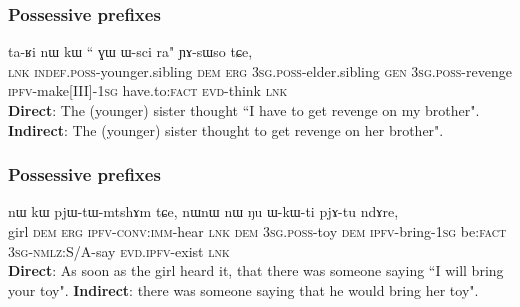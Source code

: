 \documentclass[xcolor=table]{beamer}
\newcommand{\rouge}[1]{{\color{red}#1}}
\newcommand{\bleu}[1]{{\color{blue}#1}}
\newcommand{\ipa}[1]{{\phon #1}} %
\begin{document}
 
 
   \begin{frame} 
   \frametitle{Possessive prefixes}
\begin{exe}
\ex
\gll  \ipa{tɕe}  	\ipa{ta-ʁi}  	\ipa{nɯ}  	\ipa{kɯ}  	``\rouge{\ipa{ɯ-pi}}  	\ipa{ɣɯ}  	\ipa{ɯ-sci}  	\bleu{\ipa{tu-nɤme-a}}  	\ipa{ra}" 	\ipa{ɲɤ-sɯso}  	\ipa{tɕe,}  	\\
\textsc{lnk}  \textsc{indef.poss}-younger.sibling \textsc{dem} \textsc{erg}  \rouge{\textsc{3sg.poss}-elder.sibling}  \textsc{gen} \textsc{3sg.poss}-revenge \bleu{\textsc{ipfv}-make[III]-\textsc{1sg}} have.to:\textsc{fact} \textsc{evd}-think \textsc{lnk} \\
\glt  \textbf{Direct}: The (younger) sister thought ``\bleu{I have to get revenge} on \rouge{my brother}".
\glt  \textbf{Indirect}:  The (younger) sister thought  to get revenge on \rouge{her brother}".
  \end{exe}
 \end{frame} 
 

    \begin{frame} 
       \frametitle{Possessive prefixes}
\begin{exe}
\ex
\gll   \ipa{tɤɕime}  	\ipa{nɯ}  	\ipa{kɯ}  	\ipa{pjɯ-tɯ-mtshɤm}  	\ipa{tɕe,}  	\ipa{nɯnɯ}  \rouge{\ipa{ɯ-kɯmtɕhɯ}}  	\ipa{nɯ}  	\bleu{\ipa{ju-ɣɯt-a}}  	\ipa{ŋu}  		\ipa{ɯ-kɯ-ti}  	\ipa{pjɤ-tu}  	\ipa{ndɤre,}  \\
girl \textsc{dem} \textsc{erg} \textsc{ipfv-conv:imm}-hear \textsc{lnk} \textsc{dem} \rouge{\textsc{3sg.poss}-toy} \textsc{dem} \bleu{\textsc{ipfv}-bring-\textsc{1sg}}  be:\textsc{fact} \textsc{3sg-nmlz}:S/A-say \textsc{evd.ipfv}-exist \textsc{lnk} \\
\glt   \textbf{Direct}: As soon as the girl heard it, that there was someone saying ``\bleu{I will bring} \rouge{your toy}".
\glt   \textbf{Indirect}: there was someone saying that he would bring \rouge{her toy}".
  \end{exe}
 \end{frame} 
\end{document}
